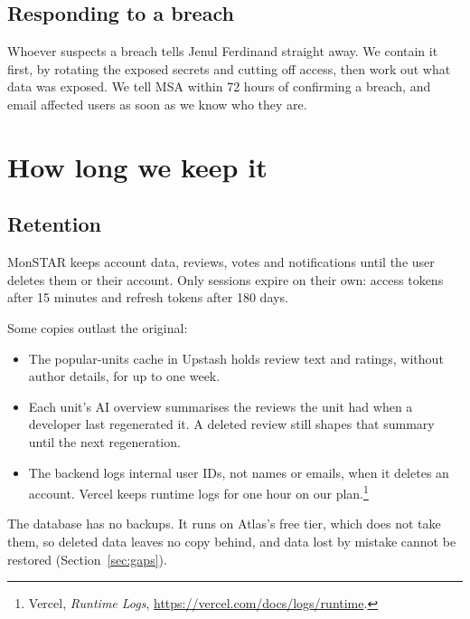 \documentclass[11pt,a4paper]{article}
\begin{document}
\subsection{Responding to a breach}

Whoever suspects a breach tells Jenul Ferdinand straight away.  We contain it
first, by rotating the exposed secrets and cutting off access, then work out
what data was exposed.  We tell MSA within 72 hours of confirming a breach,
and email affected users as soon as we know who they are.

\section{How long we keep it}
\label{sec:retention}

\subsection{Retention}

MonSTAR keeps account data, reviews, votes and notifications until the user
deletes them or their account.  Only sessions expire on their own: access
tokens after 15 minutes and refresh tokens after 180 days.

Some copies outlast the original:
\begin{itemize}
  \item The popular-units cache in Upstash holds review text and ratings,
    without author details, for up to one week.
  \item Each unit's AI overview summarises the reviews the unit had when a
    developer last regenerated it.  A deleted review still shapes that summary
    until the next regeneration.
  \item The backend logs internal user IDs, not names or emails, when it
    deletes an account.  Vercel keeps runtime logs for one hour on our
    plan.\footnote{Vercel, \emph{Runtime Logs},
    \url{https://vercel.com/docs/logs/runtime}.}
\end{itemize}
The database has no backups.  It runs on Atlas's free tier, which does not
take them, so deleted data leaves no copy behind, and data lost by mistake
cannot be restored (Section~\ref{sec:gaps}).

\end{document}
